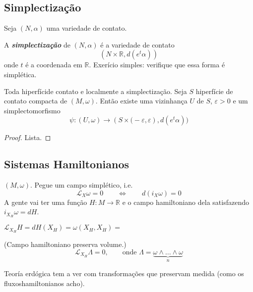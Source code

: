 \subsection{Simplectização}

Seja $(N,\alpha)$ uma variedade de contato.

\begin{defn}\leavevmode
	A \textit{\textbf{simplectização}} de $(N,\alpha)$ é a variedade de contato
	\[(N\times \mathbb{R},d(e^t\alpha))\]
	onde $t$ é a coordenada em $\mathbb{R}$. {\color{4}Exerício simples:} verifique que essa forma é simplética.
\end{defn}

\begin{thm}\leavevmode
	{\color{4}Toda hiperfícide contato e localmente a simplectização.} Seja $S$ hiperfície de contato compacta de $(M,\omega)$. Então existe uma vizinhança $U$ de $S$, $\varepsilon>0$ e um simplectomorfismo
	\[\psi:(U,\omega)\longrightarrow (S\times \Big(-\varepsilon,\varepsilon),d(e^t\alpha)\Big)\]
\end{thm}

\begin{proof}\leavevmode
	Lista.
\end{proof}

\subsection{Sistemas Hamiltonianos}

$(M,\omega)$. Pegue um campo simplético, i.e.
\[\mathcal{L}_X\omega=0\qquad \iff\qquad d(i_X\omega)=0\]
A gente vai ter uma função $H:M\to \mathbb{R}$ e o campo hamiltoniano dela satisfazendo $i_{X_H}\omega=dH$.

\begin{remark}\leavevmode
	$\mathcal{L}_{X_H}H=dH(X_H)=\omega(X_H,X_H)=$
\end{remark}

\begin{coro}\leavevmode
	{\color{3}(Campo hamiltoniano preserva volume.)}
	\[\mathcal{L}_{X_H}\Lambda=0,\qquad \text{onde }\Lambda=\underbrace{\omega\wedge \ldots \wedge \omega}_{n} \]
\end{coro}

\begin{remark}\leavevmode
	Teoría erdógica tem a ver com transformações que preservam medida (como os fluxoshamiltonianos acho).
\end{remark}

